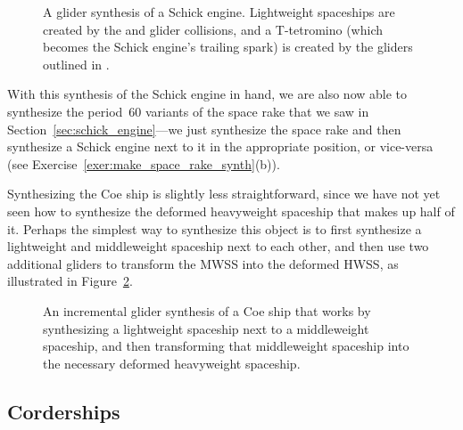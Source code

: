 \begin{figure}[!htb]
	\centering
	\caption{A glider synthesis of a Schick engine. Lightweight spaceships are created by the  and  glider collisions, and a T-tetromino (which becomes the Schick engine's trailing spark) is created by the gliders outlined in .}\label{fig:schick_engine_synth}
\end{figure}

With this synthesis of the Schick engine in hand, we are also now able to synthesize the period~$60$ variants of the space rake that we saw in Section~\ref{sec:schick_engine}---we just synthesize the space rake and then synthesize a Schick engine next to it in the appropriate position, or vice-versa (see Exercise~\ref{exer:make_space_rake_synth}(b)).

Synthesizing the Coe ship is slightly less straightforward, since we have not yet seen how to synthesize the deformed heavyweight spaceship that makes up half of it. Perhaps the simplest way to synthesize this object is to first synthesize a lightweight and middleweight spaceship next to each other, and then use two additional gliders to transform the MWSS into the deformed HWSS, as illustrated in Figure~\ref{fig:coe_ship_synth}.

\begin{figure}[!htb]
	\centering
	\caption{An incremental glider synthesis of a Coe ship that works by synthesizing a lightweight spaceship next to a middleweight spaceship, and then transforming that middleweight spaceship into the necessary deformed heavyweight spaceship.}\label{fig:coe_ship_synth}
\end{figure}


\subsection{Corderships}\label{sec:cordership_synth}

